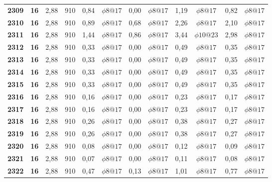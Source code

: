 \begin{table}[H]
{\begin{tabular}{|c|c|c|c|c|c|c|c|c|c|c|c|}
        \textbf{2309} & \textbf{16} & 2,88  & 910   & 0,84  & $\phi8@17$ & 0,00  & $\phi8@17$ & 1,19  & $\phi8@17$ & 0,82  & $\phi8@17$ \\
        \textbf{2310} & \textbf{16} & 2,88  & 910   & 0,89  & $\phi8@17$ & 0,68  & $\phi8@17$ & 2,26  & $\phi8@17$ & 2,10  & $\phi8@17$ \\
        \textbf{2311} & \textbf{16} & 2,88  & 910   & 1,44  & $\phi8@17$ & 0,86  & $\phi8@17$ & 3,44  & $\phi10@23$ & 2,98  & $\phi8@17$ \\
        \textbf{2312} & \textbf{16} & 2,88  & 910   & 0,33  & $\phi8@17$ & 0,00  & $\phi8@17$ & 0,49  & $\phi8@17$ & 0,35  & $\phi8@17$ \\
        \textbf{2313} & \textbf{16} & 2,88  & 910   & 0,33  & $\phi8@17$ & 0,00  & $\phi8@17$ & 0,49  & $\phi8@17$ & 0,35  & $\phi8@17$ \\
        \textbf{2314} & \textbf{16} & 2,88  & 910   & 0,33  & $\phi8@17$ & 0,00  & $\phi8@17$ & 0,49  & $\phi8@17$ & 0,35  & $\phi8@17$ \\
        \textbf{2315} & \textbf{16} & 2,88  & 910   & 0,33  & $\phi8@17$ & 0,00  & $\phi8@17$ & 0,49  & $\phi8@17$ & 0,35  & $\phi8@17$ \\
        \textbf{2316} & \textbf{16} & 2,88  & 910   & 0,16  & $\phi8@17$ & 0,00  & $\phi8@17$ & 0,23  & $\phi8@17$ & 0,17  & $\phi8@17$ \\
        \textbf{2317} & \textbf{16} & 2,88  & 910   & 0,16  & $\phi8@17$ & 0,00  & $\phi8@17$ & 0,23  & $\phi8@17$ & 0,17  & $\phi8@17$ \\
        \textbf{2318} & \textbf{16} & 2,88  & 910   & 0,26  & $\phi8@17$ & 0,00  & $\phi8@17$ & 0,38  & $\phi8@17$ & 0,27  & $\phi8@17$ \\
        \textbf{2319} & \textbf{16} & 2,88  & 910   & 0,26  & $\phi8@17$ & 0,00  & $\phi8@17$ & 0,38  & $\phi8@17$ & 0,27  & $\phi8@17$ \\
        \textbf{2320} & \textbf{16} & 2,88  & 910   & 0,08  & $\phi8@17$ & 0,00  & $\phi8@17$ & 0,12  & $\phi8@17$ & 0,09  & $\phi8@17$ \\
        \textbf{2321} & \textbf{16} & 2,88  & 910   & 0,07  & $\phi8@17$ & 0,00  & $\phi8@17$ & 0,11  & $\phi8@17$ & 0,08  & $\phi8@17$ \\
        \textbf{2322} & \textbf{16} & 2,88  & 910   & 0,47  & $\phi8@17$ & 0,13  & $\phi8@17$ & 1,01  & $\phi8@17$ & 0,77  & $\phi8@17$ \bigstrut[b]\\
        \hline
        \end{tabular}%
        }
      \label{resumenlosas23}%
    \end{table}%
    
